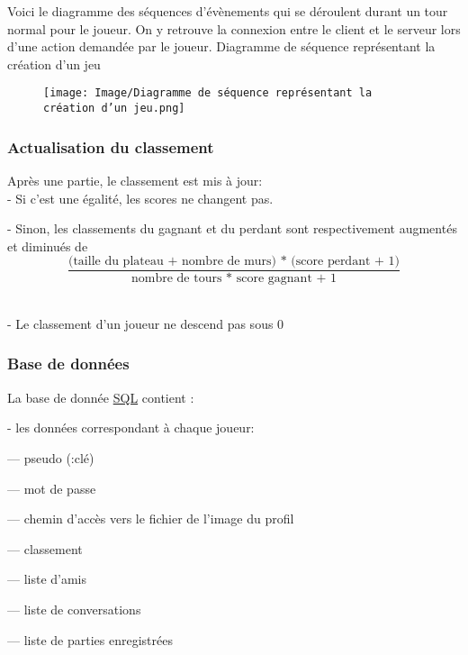 \documentclass[french, utf8]{article}
\begin{document}
Voici le diagramme des séquences d'évènements qui se déroulent durant un tour normal pour le joueur.
On y retrouve la connexion entre le client et le serveur lors d'une action demandée par le joueur.
Diagramme de séquence représentant la création d'un jeu

\begin{figure}[ht]
\centering
    \texttt{[image: Image/Diagramme de séquence représentant la création d'un jeu.png]}
\end{figure}

\subsubsection{Actualisation du classement}
\label{sec:ActualisationDuClassement}

Après une partie, le classement est mis à jour:
\\- Si c'est une égalité, les scores ne changent pas.

- Sinon,
les classements du gagnant et du perdant sont respectivement augmentés et diminués de \\

\[
 \frac{\text{(taille du plateau + nombre de murs) * (score perdant + 1)}}{\text{nombre de tours * score gagnant + 1}}
\]

\\- Le classement d'un joueur ne descend pas sous 0



\subsubsection{Base de données}
\label{sec:BaseDeDonnées}

La base de donnée \href{https://en.wikipedia.org/wiki/SQL}{SQL} contient :
\item- les données correspondant à chaque joueur:
\item--- pseudo (:clé)
\item--- mot de passe %
\item--- chemin d'accès vers le fichier de l'image du profil
\item--- classement
\item--- liste d'amis
\item--- liste de conversations
\item--- liste de parties enregistrées
\end{document}
